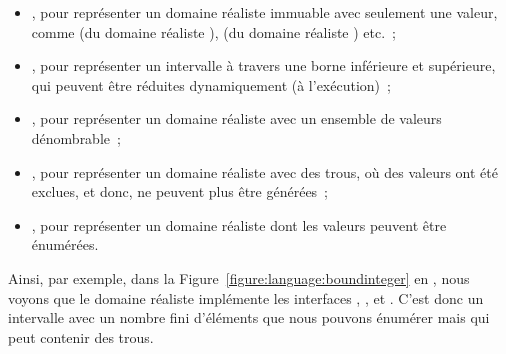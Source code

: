 \begin{itemize}

\item {}, pour représenter un domaine réaliste immuable avec
seulement une valeur, comme  (du domaine réaliste ),
 (du domaine réaliste ) etc.~;

\item {}, pour représenter un intervalle à travers une borne
inférieure et supérieure, qui peuvent être réduites dynamiquement (à
l'exécution)~;

\item {}, pour représenter un domaine réaliste avec un ensemble de
valeurs dénombrable~;

\item {}, pour représenter un domaine réaliste avec des trous, \ie
où des valeurs ont été exclues, et donc, ne peuvent plus être générées~;

\item {}, pour représenter un domaine réaliste dont les valeurs
peuvent être énumérées.

\end{itemize}

Ainsi, par exemple, dans la Figure~\ref{figure:language:boundinteger} en
, nous voyons que le domaine réaliste  implémente
les interfaces , ,  et
. C'est donc un intervalle avec un nombre fini d'éléments que
nous pouvons énumérer mais qui peut contenir des trous.
